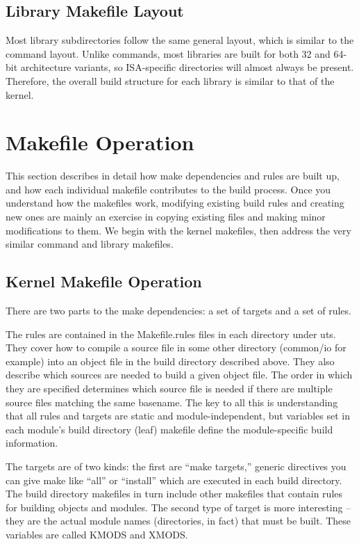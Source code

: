 \documentclass{article}
\begin{document}
\subsection*{Library Makefile Layout}

Most library subdirectories follow the same general layout, which is similar to
the command layout. Unlike commands, most libraries are built for both 32 and
64-bit architecture variants, so ISA-specific directories will almost always be
present. Therefore, the overall build structure for each library is similar to
that of the kernel.

\section*{Makefile Operation}

This section describes in detail how make dependencies and rules are built up,
and how each individual makefile contributes to the build process. Once you
understand how the makefiles work, modifying existing build rules and creating
new ones are mainly an exercise in copying existing files and making minor
modifications to them. We begin with the kernel makefiles, then address the very
similar command and library makefiles.

\subsection*{Kernel Makefile Operation}

There are two parts to the make dependencies: a set of targets and a set of
rules.

The rules are contained in the Makefile.rules files in each directory under
uts. They cover how to compile a source file in some other directory (common/io
for example) into an object file in the build directory described above. They
also describe which sources are needed to build a given object file. The order
in which they are specified determines which source file is needed if there are
multiple source files matching the same basename. The key to all this is
understanding that all rules and targets are static and module-independent, but
variables set in each module's build directory (leaf) makefile define the
module-specific build information.

The targets are of two kinds: the first are ``make targets,'' generic
directives you can give make like ``all'' or ``install'' which are executed in
each build directory. The build directory makefiles in turn include other
makefiles that contain rules for building objects and modules. The second type
of target is more interesting -- they are the actual module names (directories,
in fact) that must be built. These variables are called KMODS and XMODS.
\end{document}
